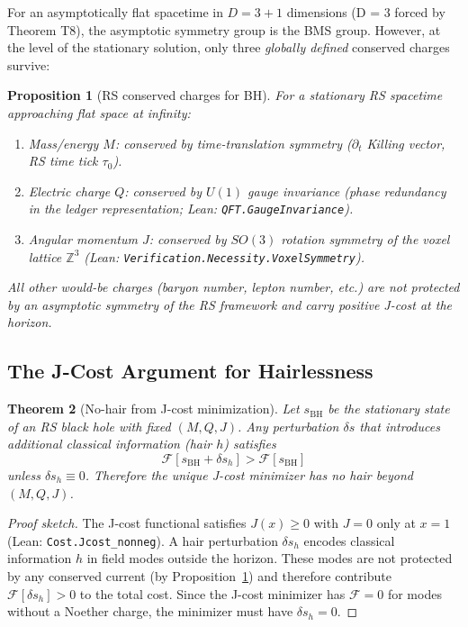 \documentclass[12pt,a4paper]{article}
\newtheorem{theorem}{Theorem}[section]
\newtheorem{proposition}[theorem]{Proposition}
\theoremstyle{definition}
\theoremstyle{remark}
\begin{document}
For an asymptotically flat spacetime in $D = 3+1$ dimensions (D = 3
forced by Theorem T8), the asymptotic symmetry group is the BMS group.
However, at the level of the stationary solution, only three
\emph{globally defined} conserved charges survive:

\begin{proposition}[RS conserved charges for BH]\label{prop:charges}
For a stationary RS spacetime approaching flat space at infinity:
\begin{enumerate}
  \item \emph{Mass/energy $M$}: conserved by time-translation symmetry
        ($\partial_t$ Killing vector, RS time tick $\tau_0$).
  \item \emph{Electric charge $Q$}: conserved by $U(1)$ gauge invariance
        (phase redundancy in the ledger representation;
        Lean: \texttt{QFT.GaugeInvariance}).
  \item \emph{Angular momentum $J$}: conserved by $SO(3)$ rotation
        symmetry of the voxel lattice $\mathbb{Z}^3$
        (Lean: \texttt{Verification.Necessity.VoxelSymmetry}).
\end{enumerate}
All other would-be charges (baryon number, lepton number, etc.) are
not protected by an asymptotic symmetry of the RS framework and carry
positive J-cost at the horizon.
\end{proposition}

\subsection{The J-Cost Argument for Hairlessness}

\begin{theorem}[No-hair from J-cost minimization]\label{thm:nohair}
Let $s_\mathrm{BH}$ be the stationary state of an RS black hole with
fixed $(M, Q, J)$.  Any perturbation $\delta s$ that introduces
additional classical information (hair $h$) satisfies
\begin{equation}
  \mathcal{F}[s_\mathrm{BH} + \delta s_h] > \mathcal{F}[s_\mathrm{BH}]
\end{equation}
unless $\delta s_h \equiv 0$.  Therefore the unique J-cost minimizer
has no hair beyond $(M, Q, J)$.
\end{theorem}

\begin{proof}[Proof sketch]
The J-cost functional satisfies $J(x) \geq 0$ with $J = 0$ only at
$x = 1$ (Lean: \texttt{Cost.Jcost\_nonneg}).  A hair perturbation
$\delta s_h$ encodes classical information $h$ in field modes outside
the horizon.  These modes are not protected by any conserved current
(by Proposition~\ref{prop:charges}) and therefore contribute
$\mathcal{F}[\delta s_h] > 0$ to the total cost.  Since the J-cost
minimizer has $\mathcal{F} = 0$ for modes without a Noether charge,
the minimizer must have $\delta s_h = 0$.
\end{proof}
\end{document}

